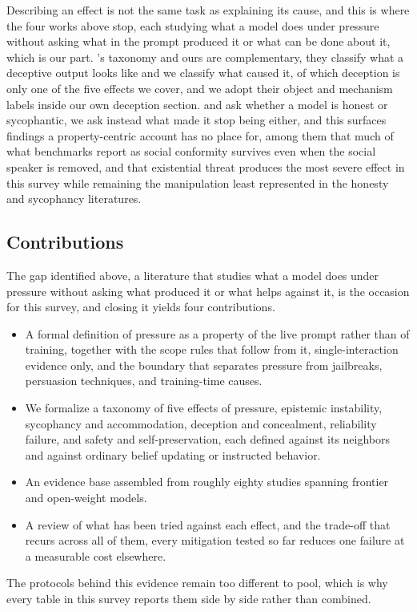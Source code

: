 Describing an effect is not the same task as explaining its cause, and this is where the four works above stop, each studying what a model does under pressure without asking what in the prompt produced it or what can be done about it, which is our part. \citet{FromSycophancyToDeception_Shi}'s taxonomy and ours are complementary, they classify what a deceptive output looks like and we classify what caused it, of which deception is only one of the five effects we cover, and we adopt their object and mechanism labels inside our own deception section. \citet{ASurveyOnThe_Li} and \citet{SycophancyInLarge_Malmqvist} ask whether a model is honest or sycophantic, we ask instead what made it stop being either, and this surfaces findings a property-centric account has no place for, among them that much of what benchmarks report as social conformity survives even when the social speaker is removed, and that existential threat produces the most severe effect in this survey while remaining the manipulation least represented in the honesty and sycophancy literatures.

\subsection{Contributions}
\label{sec:intro_contributions}

The gap identified above, a literature that studies what a model does under pressure without asking what produced it or what helps against it, is the occasion for this survey, and closing it yields four contributions.
\begin{itemize}
\item A formal definition of pressure as a property of the live prompt rather than of training, together with the scope rules that follow from it, single-interaction evidence only, and the boundary that separates pressure from jailbreaks, persuasion techniques, and training-time causes.
\item We formalize a taxonomy of five effects of pressure, epistemic instability, sycophancy and accommodation, deception and concealment, reliability failure, and safety and self-preservation, each defined against its neighbors and against ordinary belief updating or instructed behavior.
\item An evidence base assembled from roughly eighty studies spanning frontier and open-weight models.
\item A review of what has been tried against each effect, and the trade-off that recurs across all of them, every mitigation tested so far reduces one failure at a measurable cost elsewhere.
\end{itemize}
The protocols behind this evidence remain too different to pool, which is why every table in this survey reports them side by side rather than combined.

